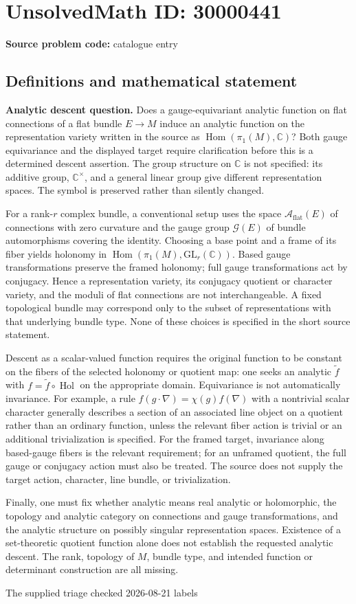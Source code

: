 \documentclass[11pt]{article}
\newcommand{\C}{\mathbb{C}}
\begin{document}
\section*{UnsolvedMath ID: 30000441}
\textbf{Source problem code:} catalogue entry
\subsection{Definitions and mathematical statement}
\textbf{Analytic descent question.} Does a gauge-equivariant analytic function on flat connections of a flat bundle \(E\to M\) induce an analytic function on the representation variety written in the source as \(\operatorname{Hom}(\pi_1(M),\C)\)? Both gauge equivariance and the displayed target require clarification before this is a determined descent assertion. The group structure on \(\C\) is not specified: its additive group, \(\C^\times\), and a general linear group give different representation spaces. The symbol is preserved rather than silently changed.\par For a rank-\(r\) complex bundle, a conventional setup uses the space \(\mathcal A_{\mathrm{flat}}(E)\) of connections with zero curvature and the gauge group \(\mathcal G(E)\) of bundle automorphisms covering the identity. Choosing a base point and a frame of its fiber yields holonomy in \(\operatorname{Hom}(\pi_1(M),\mathrm{GL}_r(\C))\). Based gauge transformations preserve the framed holonomy; full gauge transformations act by conjugacy. Hence a representation variety, its conjugacy quotient or character variety, and the moduli of flat connections are not interchangeable. A fixed topological bundle may correspond only to the subset of representations with that underlying bundle type. None of these choices is specified in the short source statement.\par Descent as a scalar-valued function requires the original function to be constant on the fibers of the selected holonomy or quotient map: one seeks an analytic \(\widetilde f\) with \(f=\widetilde f\circ\operatorname{Hol}\) on the appropriate domain. Equivariance is not automatically invariance. For example, a rule \(f(g\cdot\nabla)=\chi(g)f(\nabla)\) with a nontrivial scalar character generally describes a section of an associated line object on a quotient rather than an ordinary function, unless the relevant fiber action is trivial or an additional trivialization is specified. For the framed target, invariance along based-gauge fibers is the relevant requirement; for an unframed quotient, the full gauge or conjugacy action must also be treated. The source does not supply the target action, character, line bundle, or trivialization.\par Finally, one must fix whether analytic means real analytic or holomorphic, the topology and analytic category on connections and gauge transformations, and the analytic structure on possibly singular representation spaces. Existence of a set-theoretic quotient function alone does not establish the requested analytic descent. The rank, topology of \(M\), bundle type, and intended function or determinant construction are all missing.\par The supplied triage checked 2026-08-21 labels 
\end{document}
